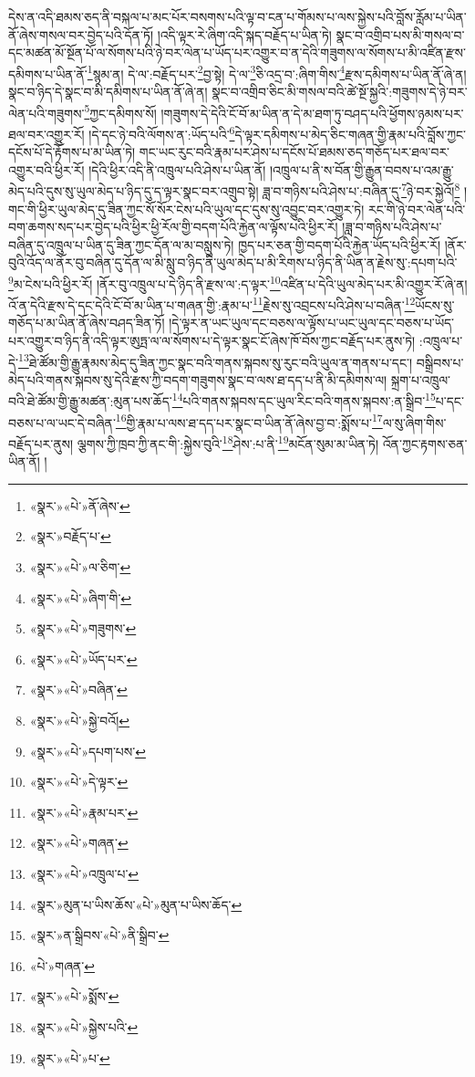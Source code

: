 དེས་ན་འདི་ཐམས་ཅད་ནི་བསྐལ་པ་མང་པོར་བསགས་པའི་ལྟ་བ་ངན་པ་གོམས་པ་ལས་སྐྱེས་པའི་བློས་རློམ་པ་ཡིན་ནོ་ཞེས་གསལ་བར་བྱེད་པའི་དོན་ཏོ། །འདི་ལྟར་རེ་ཞིག་འདི་སྐད་བརྗོད་པ་ཡིན་ཏེ། སྣང་བ་འགྲིབ་པས་མི་གསལ་བ་དང་མཚན་མོ་སྔོན་པོ་ལ་སོགས་པའི་ཉེ་བར་ལེན་པ་ཡོད་པར་འགྱུར་བ་ན་དེའི་གཟུགས་ལ་སོགས་པ་མི་འཛིན་རྫས་དམིགས་པ་ཡིན་ནོ་\footnote{«སྣར་»«པེ་»ནོ་ཞེས་}སྙམ་ན། དེ་ལ་:བརྗོད་པར་\footnote{«སྣར་»བརྗོད་པ་}བྱ་སྟེ། དེ་ལ་\footnote{«སྣར་»«པེ་»ལ་ཅིག་}ཅི་འདྲ་བ་:ཞིག་གིས་\footnote{«སྣར་»«པེ་»ཞིག་གི་}རྫས་དམིགས་པ་ཡིན་ནོ་ཞེ་ན། སྣང་བ་ཉིད་དེ་སྣང་བ་མི་དམིགས་པ་ཡིན་ནོ་ཞེ་ན། སྣང་བ་འགྲིབ་ཅིང་མི་གསལ་བའི་ཚེ་སྔོ་སྐྱའི་:གཟུགས་དེ་ཉེ་བར་ལེན་པའི་གཟུགས་\footnote{«སྣར་»«པེ་»གཟུགས་}ཀྱང་དམིགས་སོ། །གཟུགས་དེ་དེའི་ངོ་བོ་མ་ཡིན་ན་དེ་མ་ཐག་ཏུ་བཤད་པའི་ཕྱོགས་ཉམས་པར་ཐལ་བར་འགྱུར་རོ། །དེ་དང་ཉེ་བའི་ལོགས་ན་:ཡོད་པའི་\footnote{«སྣར་»«པེ་»ཡོད་པར་}དེ་ལྟར་དམིགས་པ་མེད་ཅིང་གཞན་གྱི་རྣམ་པའི་བློས་ཀྱང་དངོས་པོ་དེ་རྟོགས་པ་མ་ཡིན་ཏེ། གང་ཡང་རུང་བའི་རྣམ་པར་ཤེས་པ་དངོས་པོ་ཐམས་ཅད་གཅོད་པར་ཐལ་བར་འགྱུར་བའི་ཕྱིར་རོ། །དེའི་ཕྱིར་འདི་ནི་འཁྲུལ་པའི་ཤེས་པ་ཡིན་ནོ། །འཁྲུལ་པ་ནི་ས་བོན་གྱི་རྒྱུན་བབས་པ་འམ་རྒྱུ་མེད་པའི་དུས་སུ་ཡུལ་མེད་པ་ཉིད་དུ་ད་ལྟར་སྣང་བར་འགྲུབ་སྟེ། ཟླ་བ་གཉིས་པའི་ཤེས་པ་:བཞིན་དུ་\footnote{«སྣར་»«པེ་»བཞིན་}ཉེ་བར་སྐྱེའོ།\footnote{«སྣར་»«པེ་»སྐྱེ་བའོ།} །གང་གི་ཕྱིར་ཡུལ་མེད་དུ་ཟིན་ཀྱང་སོ་སོར་ངེས་པའི་ཡུལ་དང་དུས་སུ་འབྱུང་བར་འགྱུར་ཏེ། རང་གི་ཉེ་བར་ལེན་པའི་བག་ཆགས་སད་པར་བྱེད་པའི་ཕྱིར་ཕྱི་རོལ་གྱི་བདག་པོའི་རྐྱེན་ལ་ལྟོས་པའི་ཕྱིར་རོ། །ཟླ་བ་གཉིས་པའི་ཤེས་པ་བཞིན་དུ་འཁྲུལ་པ་ཡིན་དུ་ཟིན་ཀྱང་དོན་ལ་མ་བསླུས་ཏེ། ཁྱད་པར་ཅན་གྱི་བདག་པོའི་རྐྱེན་ཡོད་པའི་ཕྱིར་རོ། །ནོར་བུའི་འོད་ལ་ནོར་བུ་བཞིན་དུ་དོན་ལ་མི་སླུ་བ་ཉིད་ནི་ཡུལ་མེད་པ་མི་རིགས་པ་ཉིད་ནི་ཡིན་ན་རྗེས་སུ་:དཔག་པའི་\footnote{«སྣར་»«པེ་»དཔག་པས་}མ་ངེས་པའི་ཕྱིར་རོ། །ནོར་བུ་འཁྲུལ་པ་དེ་ཉིད་ནི་རྫས་ལ་:ད་ལྟར་\footnote{«སྣར་»«པེ་»དེ་ལྟར་}འཛིན་པ་དེའི་ཡུལ་མེད་པར་མི་འགྱུར་རོ་ཞེ་ན། འོ་ན་དེའི་རྫས་དེ་དང་དེའི་ངོ་བོ་མ་ཡིན་པ་གཞན་གྱི་:རྣམ་པ་\footnote{«སྣར་»«པེ་»རྣམ་པར་}རྗེས་སུ་འབྲངས་པའི་ཤེས་པ་བཞིན་\footnote{«སྣར་»«པེ་»གཞན་}ཡོངས་སུ་གཅོད་པ་མ་ཡིན་ནོ་ཞེས་བཤད་ཟིན་ཏོ། །དེ་ལྟར་ན་ཡང་ཡུལ་དང་བཅས་ལ་ལྟོས་པ་ཡང་ཡུལ་དང་བཅས་པ་ཡོད་པར་འགྱུར་བ་ཉིད་ནི་འདི་ལྟར་ཨུཏྤ་ལ་ལ་སོགས་པ་དེ་ལྟར་སྣང་ངོ་ཞེས་ཁོ་བོས་ཀྱང་བརྗོད་པར་ནུས་ཏེ། :འཁྲུལ་པ་དེ་\footnote{«སྣར་»«པེ་»འཁྲུལ་པ་}ཐེ་ཚོམ་གྱི་རྒྱུ་རྣམས་མེད་དུ་ཟིན་ཀྱང་སྣང་བའི་གནས་སྐབས་སུ་རུང་བའི་ཡུལ་ན་གནས་པ་དང་། བསྒྲིབས་པ་མེད་པའི་གནས་སྐབས་སུ་དེའི་རྫས་ཀྱི་བདག་གཟུགས་སྣང་བ་ལས་ཐ་དད་པ་ནི་མི་དམིགས་ལ། སྐྲག་པ་འཁྲུལ་བའི་ཐེ་ཚོམ་གྱི་རྒྱུ་མཚན་:མུན་པས་ཆོད་\footnote{«སྣར་»མུན་པ་ཡིས་ཆོས་«པེ་»མུན་པ་ཡིས་ཆོད་}པའི་གནས་སྐབས་དང་ཡུལ་རིང་བའི་གནས་སྐབས་:ན་སྒྲིབ་\footnote{«སྣར་»ན་སྒྲིབས་«པེ་»ནི་སྒྲིབ་}པ་དང་བཅས་པ་ལ་ཡང་དེ་བཞིན་\footnote{«པེ་»གཞན་}གྱི་རྣམ་པ་ལས་ཐ་དད་པར་སྣང་བ་ཡིན་ནོ་ཞེས་བྱ་བ་:སྨོས་པ་\footnote{«སྣར་»«པེ་»སྨོས་}ལ་སུ་ཞིག་གིས་བརྗོད་པར་ནུས། ལྕགས་ཀྱི་ཁྲབ་ཀྱི་ནང་གི་:སྐྱེས་བུའི་\footnote{«སྣར་»«པེ་»སྐྱེས་པའི་}ཤེས་:པ་ནི་\footnote{«སྣར་»«པེ་»པ་}མངོན་སུམ་མ་ཡིན་ཏེ། འོན་ཀྱང་རྟགས་ཅན་ཡིན་ནོ། །

